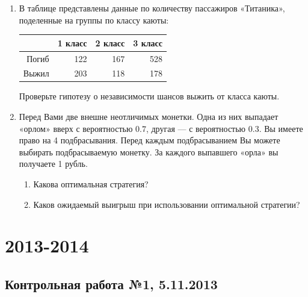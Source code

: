 \documentclass[12pt, a4paper]{article}\usepackage[]{graphicx}\usepackage[]{color}
\begin{document}
\begin{enumerate}
					\item В таблице представлены данные по количеству пассажиров «Титаника», поделенные на группы по классу каюты:

					\begin{table}[ht]
						\centering
						\begin{tabular}{rrrr}
							\hline
							& 1 класс & 2 класс & 3 класс \\
							\hline
							Погиб & 122 & 167 & 528 \\
							Выжил & 203 & 118 & 178 \\
							\hline
						\end{tabular}
					\end{table}


					Проверьте гипотезу о независимости шансов выжить от класса каюты.

					\item Перед Вами две внешне неотличимых монетки. Одна из них выпадает «орлом» вверх с вероятностью $0.7$, другая — с вероятностью $0.3$. Вы имеете право на 4 подбрасывания. Перед каждым подбрасыванием Вы можете выбирать подбрасываемую монетку. За каждого выпавшего «орла» вы получаете 1 рубль.
					\begin{enumerate}
						\item Какова оптимальная стратегия?
						\item Каков ожидаемый выигрыш при использовании оптимальной стратегии?
					\end{enumerate}

				\end{enumerate}


				\section{2013-2014}

				\subsection{Контрольная работа №1, 5.11.2013}
\end{document}
